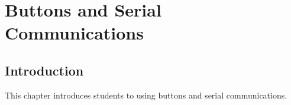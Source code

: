 \chapter{Buttons and Serial Communications}

\section{Introduction}
This chapter introduces students to using buttons and serial communications.

